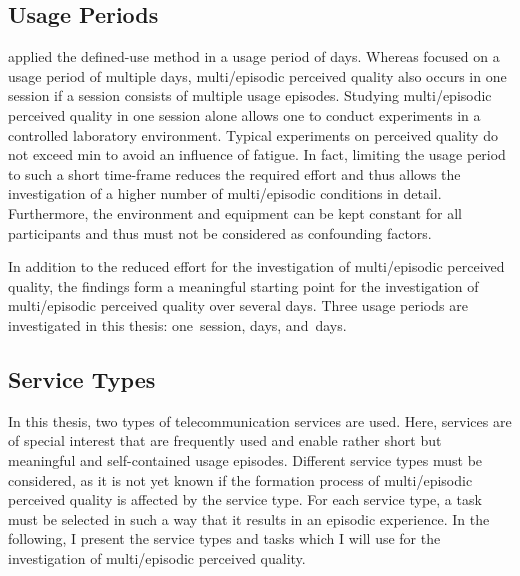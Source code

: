 \subsection{Usage Periods}
\citet{moller_single-call_2011} applied the defined-use method in a usage period of \unit[12]{days}. 
Whereas \citet{moller_single-call_2011} focused on a usage period of multiple days, multi\-/episodic perceived quality also occurs in one session if a session consists of multiple usage episodes.
Studying multi\-/episodic perceived quality in one session alone allows one to conduct experiments in a controlled laboratory environment. %
Typical experiments on perceived quality do not exceed \unit[90]{min} to avoid an influence of fatigue.
In fact, limiting the usage period to such a short time-frame reduces the required effort and thus allows the investigation of a higher number of multi\-/episodic conditions in detail.
Furthermore, the environment and equipment can be kept constant for all participants and thus must not be considered as confounding factors.

In addition to the reduced effort for the investigation of multi\-/episodic perceived quality, the findings form a meaningful starting point for the investigation of multi\-/episodic perceived quality over several days.
Three usage periods are investigated in this thesis: one~session, \unit[6]{days}, and~\unit[14]{days}.

\subsection{Service Types}
In this thesis, two types of telecommunication services are used.
Here, services are of special interest that are frequently used and enable rather short but meaningful and self-contained usage episodes.
Different service types must be considered, as it is not yet known if the formation process of multi\-/episodic perceived quality is affected by the service type.
For each service type, a task must be selected in such a way that it results in an episodic experience.
In the following, I present the service types and tasks which I will use for the investigation of multi\-/episodic perceived quality.

